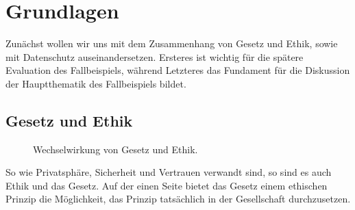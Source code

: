 \section{Grundlagen}

Zunächst wollen wir uns mit dem Zusammenhang von Gesetz und Ethik, sowie mit Datenschutz auseinandersetzen.
Ersteres ist wichtig für die spätere Evaluation des Fallbeispiels,
während Letzteres das Fundament für die Diskussion der Hauptthematik des Fallbeispiels bildet.

\subsection{Gesetz und Ethik}
\label{sec:02:lawethics}

\begin{figure}
    \centering
    \caption{Wechselwirkung von Gesetz und Ethik.}
    \label{fig:02:lawethics}
\end{figure}

So wie Privatsphäre, Sicherheit und Vertrauen verwandt sind, so sind es auch Ethik und das Gesetz.
Auf der einen Seite bietet das Gesetz einem ethischen Prinzip die Möglichkeit, 
das Prinzip tatsächlich in der Gesellschaft durchzusetzen.\cite{lee_ethical_2016}

